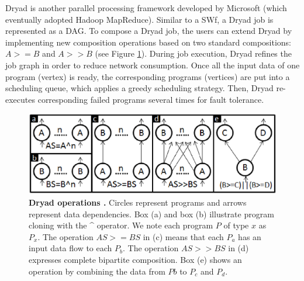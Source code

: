 Dryad \cite{Isard2007} is another parallel processing framework
developed by Microsoft (which eventually adopted Hadoop MapReduce).
Similar to a SWf, a Dryad job is represented as a DAG. 
To compose a Dryad job, the users can extend Dryad by implementing new composition operations based
on two standard compositions: $A>=B$ and $A>>B$ (see Figure \ref{fig:f8}). 
During job execution, Dryad refines the job graph in order to reduce
network consumption. Once all the input data of one program (vertex) is
ready, the corresponding programs (vertices) are put into a scheduling
queue, which applies a greedy scheduling strategy.
Then, Dryad re-executes corresponding failed programs several times for fault tolerance.

\begin{figure}
\begin{centering}
\captionsetup{justification=centering}
\includegraphics[width=129mm]{figures/f8}
\par\end{centering}

\caption{\textbf{Dryad operations \cite{Isard2007}. } Circles represent programs
and arrows represent data dependencies. Box (a) and box (b) illustrate
program cloning with the \textasciicircum{} operator. We note each program
$P$ of type $x$ as $P_x$. The
operation $AS>=BS$ in (c) means that each $P_a$
has an input data flow to each $P_b$. The operation
$AS>>BS$ in (d) expresses complete
bipartite composition. Box (e) shows an operation by combining
the data from $Pb$ to $P_c$
and $P_d$.}
\label{fig:f8} 
\end{figure}

